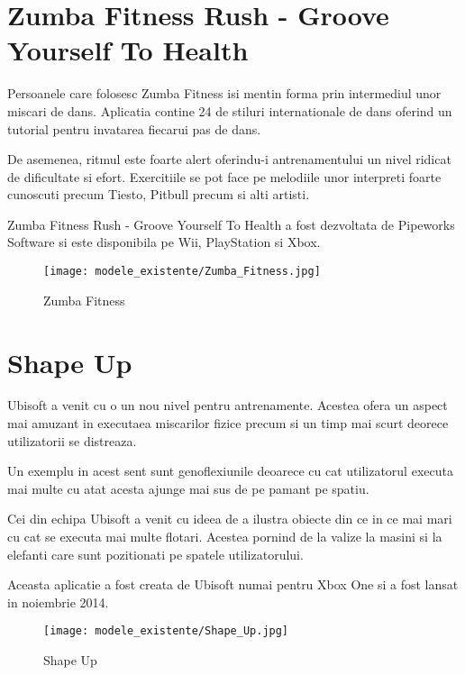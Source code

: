 \documentclass[12pt,a4paper]{report}
\begin{document}
\section{Zumba Fitness Rush - Groove Yourself To Health}

Persoanele care folosesc Zumba Fitness isi mentin forma prin intermediul unor miscari de dans. Aplicatia contine 24 de stiluri internationale de dans oferind un tutorial pentru invatarea fiecarui pas de dans. 

De asemenea, ritmul este foarte alert oferindu-i antrenamentului un nivel ridicat de dificultate si efort. Exercitiile se pot face pe melodiile unor interpreti foarte cunoscuti precum Tiesto, Pitbull precum si alti artisti. 

Zumba Fitness Rush - Groove Yourself To Health a fost dezvoltata de Pipeworks Software si este disponibila pe Wii, PlayStation si Xbox.

\begin{figure}[th]
\centering
\texttt{[image: modele\_existente/Zumba\_Fitness.jpg]} 
  \caption[Zumba Fitness]{Zumba Fitness\protect\footnotemark}
  \label{figure_1:picture_8}
\end{figure}

\section{Shape Up}

Ubisoft a venit cu o un nou nivel pentru antrenamente. Acestea ofera un aspect mai amuzant in executaea miscarilor fizice precum si un timp mai scurt deorece utilizatorii se distreaza.

Un exemplu in acest sent sunt genoflexiunile deoarece cu cat utilizatorul executa mai multe cu atat acesta ajunge mai sus de pe pamant pe spatiu.

Cei din echipa Ubisoft a venit cu ideea de a ilustra obiecte din ce in ce mai mari cu cat se executa mai multe flotari. Acestea pornind de la valize la masini si la elefanti care sunt pozitionati pe spatele utilizatorului.

Aceasta aplicatie a fost creata de Ubisoft numai pentru Xbox One si a fost lansat in noiembrie 2014.

\begin{figure}[th]
\centering
\texttt{[image: modele\_existente/Shape\_Up.jpg]}
  \caption[Shape Up]{Shape Up\protect\footnotemark}
  \label{figure_1:picture_9}
\end{figure}
\end{document}
